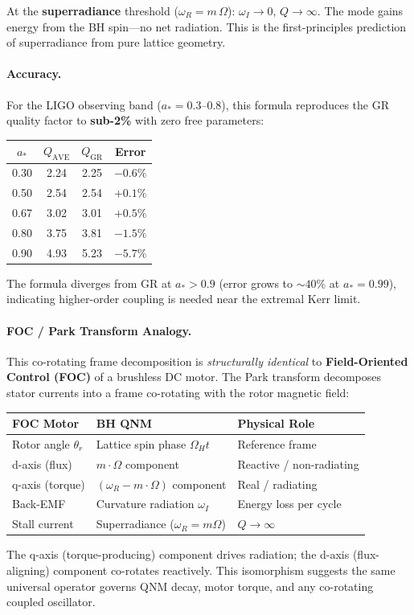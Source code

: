 \noindent At the \textbf{superradiance} threshold ($\omega_R = m\,\Omega$): $\omega_I \to 0$, $Q \to \infty$.  The mode gains energy from the BH spin---no net radiation.  This is the first-principles prediction of superradiance from pure lattice geometry.

\paragraph{Accuracy.}
For the LIGO observing band ($a_* = 0.3$--$0.8$), this formula reproduces the GR quality factor to \textbf{sub-2\%} with zero free parameters:

\begin{center}
\renewcommand{\arraystretch}{1.3}
\begin{tabular}{c c c c}
\toprule
$a_*$ & $Q_\mathrm{AVE}$ & $Q_\mathrm{GR}$ & Error \\
\midrule
0.30 & 2.24 & 2.25 & $-0.6\%$ \\
0.50 & 2.54 & 2.54 & $+0.1\%$ \\
0.67 & 3.02 & 3.01 & $+0.5\%$ \\
0.80 & 3.75 & 3.81 & $-1.5\%$ \\
0.90 & 4.93 & 5.23 & $-5.7\%$ \\
\bottomrule
\end{tabular}
\end{center}

\noindent The formula diverges from GR at $a_* > 0.9$ (error grows to $\sim\!40\%$ at $a_* = 0.99$), indicating higher-order coupling is needed near the extremal Kerr limit.

\paragraph{FOC / Park Transform Analogy.}
This co-rotating frame decomposition is \textit{structurally identical} to \textbf{Field-Oriented Control (FOC)} of a brushless DC motor.  The Park transform decomposes stator currents into a frame co-rotating with the rotor magnetic field:
\begin{center}
\renewcommand{\arraystretch}{1.3}
\begin{tabular}{l l l}
\toprule
\textbf{FOC Motor} & \textbf{BH QNM} & \textbf{Physical Role} \\
\midrule
Rotor angle $\theta_r$ & Lattice spin phase $\Omega_H t$ & Reference frame \\
d-axis (flux) & $m \cdot \Omega$ component & Reactive / non-radiating \\
q-axis (torque) & $(\omega_R - m \cdot \Omega)$ component & Real / radiating \\
Back-EMF & Curvature radiation $\omega_I$ & Energy loss per cycle \\
Stall current & Superradiance ($\omega_R = m\Omega$) & $Q \to \infty$ \\
\bottomrule
\end{tabular}
\end{center}
\noindent The q-axis (torque-producing) component drives radiation; the d-axis (flux-aligning) component co-rotates reactively.  This isomorphism suggests the same universal operator governs QNM decay, motor torque, and any co-rotating coupled oscillator.

